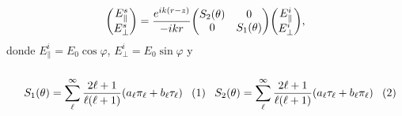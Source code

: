 	\begin{tcolorbox}[title = Matriz de esparcimiento de Mie,  breakable ]
	\begin{align}
	\mqty(E_{\parallel}^s\\E_{\perp}^s)  =  
		\frac{e^{ik(r-z)}}{-ikr} \mqty(S_2 (\theta) & 0\\ 0 & S_1 (\theta))
	\mqty(E_{\parallel}^i\\E_{\perp}^i),	
	\label{eq:MieMatrix}
	\end{align}
	donde $E^i_\parallel=E_0\cos\varphi$, $E^i_\perp = E_0\sin\varphi$ y \begin{subequations}\\
	\eqhalf{	S_1 (\theta) = \sum_\ell^\infty\frac{2\ell+1}{\ell(\ell+1)}(a_\ell\pi_\ell+b_\ell\tau_\ell)
				\label{eqs:S_1}}
	\eqhalf{	S_2 (\theta) = \sum_\ell^\infty\frac{2\ell+1}{\ell(\ell+1)}( a_\ell \tau_\ell + b_\ell\pi_\ell )
			 \label{eqs:S_2}	}
	\label{eq:MatrixElements}	\end{subequations}
	\end{tcolorbox}\vspace*{-.75em}\noindent

